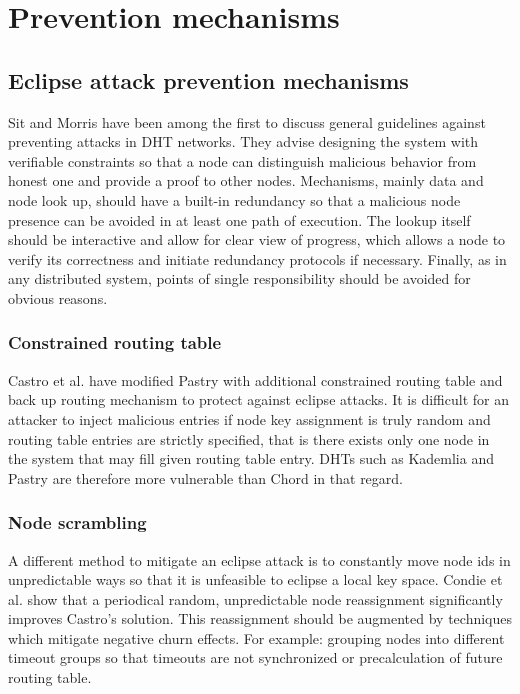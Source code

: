 \section{Prevention mechanisms}
\subsection{Eclipse attack prevention mechanisms}

  Sit and Morris \cite{sit02} have been among the first to discuss general
  guidelines against preventing attacks in DHT networks. They advise designing
  the system with verifiable constraints so that a node can distinguish
  malicious behavior from honest one and provide a proof to other nodes.
  Mechanisms, mainly data and node look up, should have a built-in redundancy so
  that a malicious node presence can be avoided in at least one path of
  execution. The lookup itself should be interactive and allow for clear view of
  progress, which allows a node to verify its correctness and initiate
  redundancy protocols if necessary. Finally, as in any distributed system,
  points of single responsibility should be avoided for obvious reasons.
  
  \subsubsection{Constrained routing table}
  Castro et al. \cite{cas02} have modified Pastry with additional constrained
  routing table and back up routing mechanism to protect against eclipse
  attacks. It is difficult for an attacker to inject malicious entries if node
  key assignment is truly random and routing table entries are strictly
  specified, that is there exists only one node in the system that may fill
  given routing table entry.  DHTs such as Kademlia and Pastry are therefore
  more vulnerable than Chord in that regard.

  \subsubsection{Node scrambling}
  A different method to mitigate an eclipse attack is to constantly move node
  ids in unpredictable ways so that it is unfeasible to eclipse a local
  key space. Condie et al. \cite{con06} show that a periodical random,
  unpredictable node reassignment significantly improves Castro's solution.
  This reassignment should be augmented by techniques which mitigate negative
  churn effects. For example: grouping nodes into different timeout groups so
  that timeouts are not synchronized or precalculation of future routing table.

